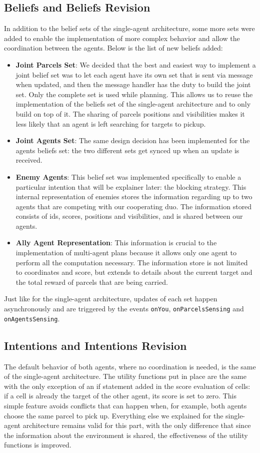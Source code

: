 \documentclass[a4paper, 11pt]{article}
\begin{document}
\subsection{Beliefs and Beliefs Revision}
In addition to the belief sets of the single-agent architecture, some more sets were added to enable the implementation of more complex behavior and allow the coordination between the agents. Below is the list of new beliefs added:
\begin{itemize}
\item \textbf{Joint Parcels Set}: We decided that the best and easiest way to implement a joint belief set was to let each agent have its own set that is sent via message when updated, and then the message handler has the duty to build the joint set. Only the complete set is used while planning. This allows us to reuse the implementation of the beliefs set of the single-agent architecture and to only build on top of it. The sharing of parcels positions and visibilities makes it less likely that an agent is left searching for targets to pickup.
\item \textbf{Joint Agents Set}: The same design decision has been implemented for the agents beliefs set: the two different sets get synced up when an update is received.
\item \textbf{Enemy Agents}: This belief set was implemented specifically to enable a particular intention that will be explainer later: the blocking strategy. This internal representation of enemies stores the information regarding up to two agents that are competing with our cooperating duo. The information stored consists of ids, scores, positions and visibilities, and is shared between our agents.
\item \textbf{Ally Agent Representation}: This information is crucial to the implementation of multi-agent plans because it allows only one agent to perform all the computation necessary. The information store is not limited to coordinates and score, but extends to details about the current target and the total reward of parcels that are being carried.
\end{itemize}

Just like for the single-agent architecture, updates of each set happen asynchronously and are triggered by the events \verb|onYou|, \verb|onParcelsSensing| and \verb|onAgentsSensing|.


\subsection{Intentions and Intentions Revision}
The default behavior of both agents, where no coordination is needed, is the same of the single-agent architecture. The utility functions put in place are the same with the only exception of an if statement added in the score evaluation of cells: if a cell is already the target of the other agent, its score is set to zero. This simple feature avoids conflicts that can happen when, for example, both agents choose the same parcel to pick up. Everything else we explained for the single-agent architecture remains valid for this part, with the only difference that since the information about the environment is shared, the effectiveness of the utility functions is improved.
\end{document}
